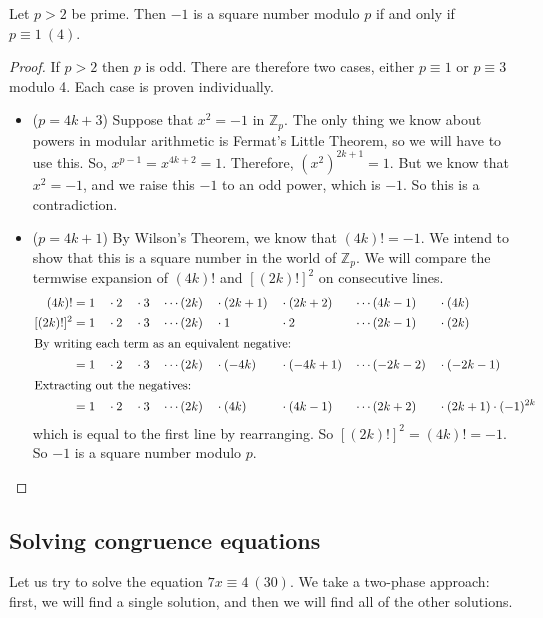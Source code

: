 \begin{proposition}
	Let \(p>2\) be prime.
	Then \(-1\) is a square number modulo \(p\) if and only if \(p \equiv 1\ (4)\).
\end{proposition}
\begin{proof}
	If \(p>2\) then \(p\) is odd.
	There are therefore two cases, either \(p \equiv 1\) or \(p \equiv 3\) modulo 4.
	Each case is proven individually.
	\begin{itemize}
		\item (\(p = 4k + 3\)) Suppose that \(x^2 = -1\) in \(\mathbb Z_p\).
		      The only thing we know about powers in modular arithmetic is Fermat's Little Theorem, so we will have to use this.
		      So, \(x^{p-1} = x^{4k+2} = 1\).
		      Therefore, \((x^2)^{2k+1} = 1\).
		      But we know that \(x^2=-1\), and we raise this \(-1\) to an odd power, which is \(-1\).
		      So this is a contradiction.
		\item (\(p = 4k + 1\)) By Wilson's Theorem, we know that \((4k)!
		      = -1\).
		      We intend to show that this is a square number in the world of \(\mathbb Z_p\).
		      We will compare the termwise expansion of \((4k)!
		      \) and \([(2k)!]^2\) on consecutive lines.
		      \begin{alignat*}{9}
			      (4k)!
			                & = 1 &  & \cdot 2 &  & \cdot 3 &  & \cdots (2k) &  & \cdot (2k+1) &  & \cdot (2k+2)  &  & \cdots (4k-1)  &  & \cdot (4k)                   \\
			      [(2k)!]^2 & = 1 &  & \cdot 2 &  & \cdot 3 &  & \cdots (2k) &  & \cdot 1      &  & \cdot 2       &  & \cdots (2k-1)  &  & \cdot (2k)                   \\
			      \intertext{By writing each term as an equivalent negative:}
			                & = 1 &  & \cdot 2 &  & \cdot 3 &  & \cdots (2k) &  & \cdot (-4k)  &  & \cdot (-4k+1) &  & \cdots (-2k-2) &  & \cdot (-2k-1)                \\
			      \intertext{Extracting out the negatives:}
			                & = 1 &  & \cdot 2 &  & \cdot 3 &  & \cdots (2k) &  & \cdot (4k)   &  & \cdot (4k-1)  &  & \cdots (2k+2)  &  & \cdot (2k+1) \cdot (-1)^{2k}
		      \end{alignat*}
		      which is equal to the first line by rearranging.
		      So \([(2k)!]^2 = (4k)!
		      = -1\).
		      So \(-1\) is a square number modulo \(p\).
	\end{itemize}
\end{proof}

\subsection{Solving congruence equations}
Let us try to solve the equation \(7x \equiv 4\ (30)\).
We take a two-phase approach: first, we will find a single solution, and then we will find all of the other solutions.

